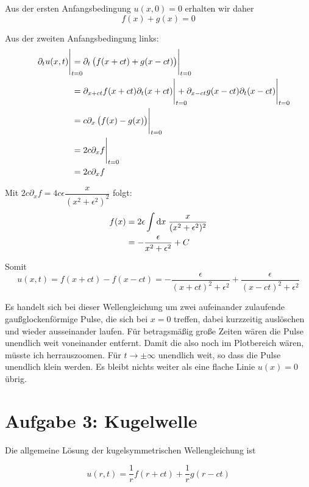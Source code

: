 \documentclass[a4paper,german,12pt,smallheadings]{scrartcl}
\begin{document}
Aus der ersten Anfangsbedingung $u(x,0) = 0$ erhalten wir daher
\begin{equation}
  f(x) + g(x) = 0
\end{equation}

Aus der zweiten Anfangsbedingung links:
\begin{align}
 \eval{\partial_t u(x,t)}_{\mathrlap{t=0}} 
 &= \eval{\partial_t \del{f(x+ct) + g(x-ct)}}_{t=0} \\
 &= \eval{\partial_{x+ct} f(x+ct) \partial_{t} (x+ct)}_{\mathrlap{t=0}} +
    \eval{\partial_{x-ct} g(x-ct) \partial_{t} (x-ct)}_{\mathrlap{t=0}} \\
 &= \eval{c \partial_x \del{f(x) - g(x)}}_{t=0} \\
 &= \eval{2c \partial_x f}_{t=0} \\
 &= 2c \partial_x f
\end{align}

Mit $2c \partial_x f = 4c \epsilon \dfrac{x}{(x^2+\epsilon^2)^2}$ folgt:
\begin{align}
  f(x)
  &= 2 \epsilon \int \dif x \; \frac{x}{(x^2+\epsilon^2)^2} \\
  &= -\frac{\epsilon}{x^2 + \epsilon^2} + C
\end{align}

Somit
\begin{equation}
  u(x,t) = f(x+ct) - f(x-ct) = -\frac{\epsilon}{(x+ct)^2 + \epsilon^2} + \frac{\epsilon}{(x-ct)^2 + \epsilon^2}
\end{equation}

Es handelt sich bei dieser Wellengleichung um zwei aufeinander zulaufende
gaußglockenförmige Pulse, die sich bei $x=0$ treffen, dabei kurzzeitig
auslöschen und wieder ausseinander laufen. Für betragsmäßig große Zeiten wären
die Pulse unendlich weit voneinander entfernt. Damit die also noch im
Plotbereich wären, müsste ich herrauszoomen. Für $t \to \pm \infty$ unendlich
weit, so dass die Pulse unendlich klein werden. Es bleibt nichts weiter als
eine flache Linie $u(x) = 0$ übrig.

\section*{Aufgabe 3: Kugelwelle}
Die allgemeine Lösung der kugelsymmetrischen Wellengleichung ist

\begin{equation}
  u(r,t) = \frac{1}{r} f(r+ct) + \frac{1}{r} g(r-ct)
\end{equation}
\end{document}
